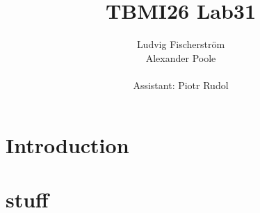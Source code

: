 \documentclass[a4paper,12pt]{article}
\title{TBMI26 Lab31}
\author{Ludvig Fischerstr\"{o}m \\Alexander Poole\\ \\Assistant: Piotr Rudol}
\begin{document}
\maketitle
	\thispagestyle{empty}
\newpage


\section*{Introduction}

\section*{stuff}
\end{document}

